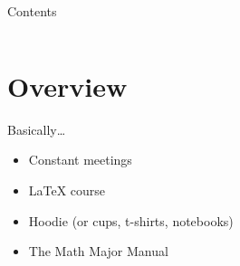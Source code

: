 \begin{frame}
    \maketitle
\end{frame}

\begin{frame}{Contents}
    \begin{columns}
        \linespread{1.75}\selectfont
         \tableofcontents
    \end{columns}
   
\end{frame}

\section{Overview}

\begin{frame}{Basically\ldots}
    \begin{itemize}
        \item Constant meetings
        \item LaTeX course
        \item Hoodie (or cups, t-shirts, notebooks)
        \item The Math Major Manual
    \end{itemize}
\end{frame}